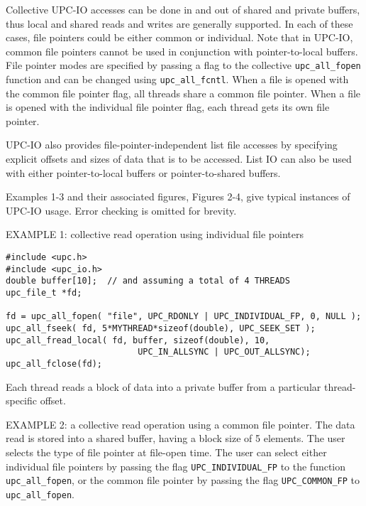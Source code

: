 \documentclass[12pt,titlepage]{article}
\newcounter{parnum}
\newcommand\np{\addtocounter{parnum}{1}\hspace{-2em}\makebox[2em][l]{\arabic{parnum}}}
\begin{document}

\np Collective UPC-IO accesses can be done in and out of shared and private
buffers, thus local and shared reads and writes are generally supported.
In each of these cases, file pointers could be either common or individual.
Note that in UPC-IO, common file pointers cannot be used in conjunction with
pointer-to-local buffers. 
File pointer modes are specified by passing a flag to the collective
{\tt upc\_all\_fopen} function and can be changed using {\tt upc\_all\_fcntl}.
When a file is opened with the common file pointer flag, all threads share a
common file pointer. When a file is opened with the individual file pointer
flag, each thread gets its own file pointer.

\np UPC-IO also provides file-pointer-independent list file accesses by specifying
explicit offsets and sizes of data that is to be accessed. List IO can also
be used with either pointer-to-local buffers or pointer-to-shared buffers.

\np Examples 1-3 and their associated figures, Figures 2-4, give typical
instances of UPC-IO usage. Error checking is omitted for brevity.

\np EXAMPLE 1: collective read operation using individual file pointers
\begin{verbatim}
#include <upc.h>
#include <upc_io.h>
double buffer[10];  // and assuming a total of 4 THREADS
upc_file_t *fd; 

fd = upc_all_fopen( "file", UPC_RDONLY | UPC_INDIVIDUAL_FP, 0, NULL );
upc_all_fseek( fd, 5*MYTHREAD*sizeof(double), UPC_SEEK_SET );
upc_all_fread_local( fd, buffer, sizeof(double), 10, 
                          UPC_IN_ALLSYNC | UPC_OUT_ALLSYNC);
upc_all_fclose(fd);
\end{verbatim}


 Each thread reads a block of data into a private buffer from a particular thread-specific offset.

\np EXAMPLE 2: a collective read operation using a common file pointer. 
The data read is stored into a shared buffer,
having a block size of 5 elements. The user selects the type of file pointer
at file-open time. The user can select either individual file pointers by
passing the flag {\tt UPC\_INDIVIDUAL\_FP} to the function {\tt upc\_all\_fopen}, or the
common file pointer by passing the flag {\tt UPC\_COMMON\_FP} to {\tt upc\_all\_fopen}.
\end{document}
